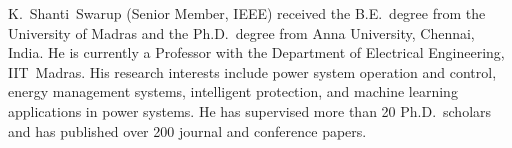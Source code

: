 \documentclass[10pt,journal,twoside]{IEEEtran}
\begin{document}
\begin{IEEEbiographynophoto}{K.~Shanti~Swarup}
  (Senior Member, IEEE) received the B.E.\ degree from the University of
  Madras and the Ph.D.\ degree from Anna University, Chennai, India.  He is
  currently a Professor with the Department of Electrical Engineering,
  IIT~Madras.  His research interests include power system operation and
  control, energy management systems, intelligent protection, and machine
  learning applications in power systems.  He has supervised more than
  20 Ph.D.\ scholars and has published over 200 journal and conference papers.
\end{IEEEbiographynophoto}



\end{document}
